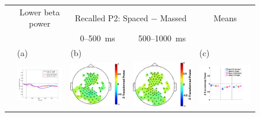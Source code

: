 

\begin{figure}[H]
  \centering
  \begin{tabular}{ccccc}
  & Lower beta power & \multicolumn{2}{c}{Recalled P2: Spaced $-$ Massed} & Means \\
  &  & 0--500~ms & 500--1000~ms \\
  & \multicolumn{1}{l}{(a)} & \multicolumn{1}{l}{(b)} & & \multicolumn{1}{l}{(c)} \\
  \raisebox{1.8cm}{\rotatebox{90}{Word}} & \includegraphics[width=.30\textwidth]{./figs/exp1/tfr_line_ga_word_RgH_rc_mass_p2_word_RgH_fo_mass_p2_word_RgH_rc_spac_p2_word_RgH_fo_spac_p2_81ROIs_-100_1000_13_21_legend} &
  \includegraphics[width=.19\textwidth]{./figs/exp1/tfr_topocont_ga_word_RgH_rc_spac_p2vsword_RgH_rc_mass_p2_81ROIs_13_21_0_500_-1p0_1p0_cb} &
  \includegraphics[width=.19\textwidth]{./figs/exp1/tfr_topocont_ga_word_RgH_rc_spac_p2vsword_RgH_rc_mass_p2_81ROIs_13_21_520_1000_-1p0_1p0_cb} &
  \includegraphics[width=.30\textwidth]{./figs/exp1/tfr_avg_ga_word_RgH_rc_mass_p2_word_RgH_fo_mass_p2_word_RgH_rc_spac_p2_word_RgH_fo_spac_p2_81ROI_0_333_333_666_666_1000_13_21_ylabel} \\

\end{tabular}
\end{figure}
